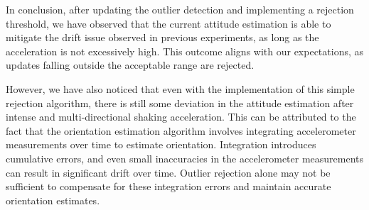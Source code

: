 In conclusion, after updating the outlier detection and implementing a rejection threshold, we have observed that the current attitude estimation is able to mitigate the drift issue observed in previous experiments, as long as the acceleration is not excessively high. This outcome aligns with our expectations, as updates falling outside the acceptable range are rejected.

However, we have also noticed that even with the implementation of this simple rejection algorithm, there is still some deviation in the attitude estimation after intense and multi-directional shaking acceleration. This can be attributed to the fact that the orientation estimation algorithm involves integrating accelerometer measurements over time to estimate orientation. Integration introduces cumulative errors, and even small inaccuracies in the accelerometer measurements can result in significant drift over time. Outlier rejection alone may not be sufficient to compensate for these integration errors and maintain accurate orientation estimates. 